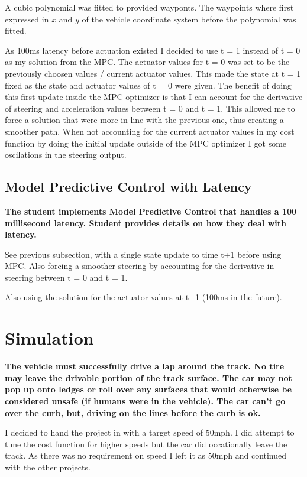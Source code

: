 \documentclass[12pt,a4paper]{article}
\begin{document}
A cubic polynomial was fitted to provided wayponts. The waypoints where first expressed in $x$ and $y$ of the vehicle coordinate system before the polynomial was fitted. 

As 100ms latency before actuation existed I decided to use t = 1 instead of t = 0 as my solution from the MPC. The actuator values for t = 0 was set to be the previously choosen values / current actuator values. This made the state at t = 1 fixed as the state and actuator values of t = 0 were given. The benefit of doing this first update inside the MPC optimizer is that I can account for the derivative of steering and acceleration values between t = 0 and t = 1. This allowed me to force a solution that were more in line with the previous one, thus creating a smoother path. When not accounting for the current actuator values in my cost function by doing the initial update outside of the MPC optimizer I got some oscilations in the steering output.

\subsection{Model Predictive Control with Latency}
\textbf{The student implements Model Predictive Control that handles a 100 millisecond latency. Student provides details on how they deal with latency.}

See previous subsection, with a single state update to time t+1 before using MPC. Also forcing a smoother steering by accounting for the derivative in steering between t = 0 and t = 1.

Also using the solution for the actuator values at t+1 (100ms in the future).

\section{Simulation}
\textbf{The vehicle must successfully drive a lap around the track. No tire may leave the drivable portion of the track surface. The car may not pop up onto ledges or roll over any surfaces that would otherwise be considered unsafe (if humans were in the vehicle). The car can't go over the curb, but, driving on the lines before the curb is ok.}

I decided to hand the project in with a target speed of 50mph. I did attempt to tune the cost function for higher speeds but the car did occationally leave the track. As there was no requirement on speed I left it as 50mph and continued with the other projects.
\end{document}
